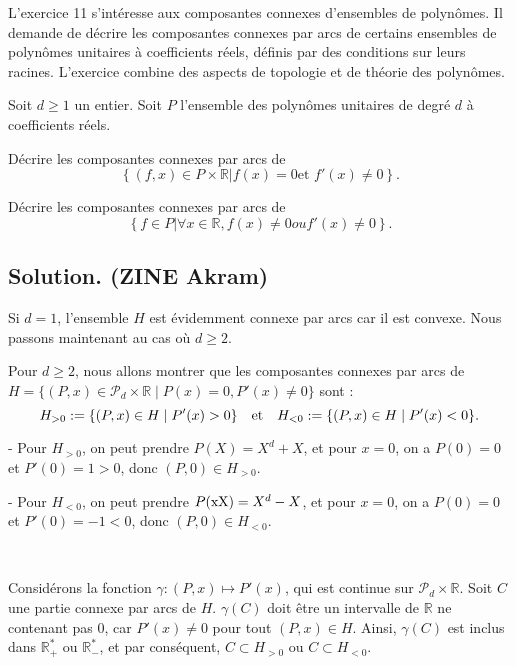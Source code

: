 L'exercice 11 s'int{\'e}resse aux composantes connexes d'ensembles de
polyn{\^o}mes. Il demande de d{\'e}crire les composantes connexes par arcs de
certains ensembles de polyn{\^o}mes unitaires {\`a} coefficients r{\'e}els,
d{\'e}finis par des conditions sur leurs racines. L'exercice combine des
aspects de topologie et de th{\'e}orie des polyn{\^o}mes.
\begin{exercise}
Soit $d \geq 1$ un entier. Soit $P$ l'ensemble des polyn{\^o}mes unitaires de
degr{\'e} $d$ {\`a} coefficients r{\'e}els.

D{\'e}crire les composantes connexes par arcs de
\[ \left\{ (f, x) \in P \times \mathbb{R} | f (x) = 0 \text{et } f' (x) \neq 0
   \right\} . \]


D{\'e}crire les composantes connexes par arcs de
\[ \left\{ f \in P | \forall x \in \mathbb{R}, f (x) \neq 0 ou  f' (x)
   \neq 0 \right\} . \]
\end{exercise}

\subsection*{Solution. (ZINE Akram)}


\tmtextbf{}Si $d = 1$, l'ensemble $H$ est {\'e}videmment connexe par arcs car
il est convexe. Nous passons maintenant au cas o{\`u} $d \geq 2$.

Pour $d \geq 2$, nous allons montrer que les composantes connexes par arcs de
$H =\{(P, x) \in \mathcal{P}_d \times \mathbb{R} \mid P (x) = 0, P' (x) \neq
0\}$ sont :
\[ H_{> 0} := \{(P, x) \in H \mid P' (x) > 0\} \quad \text{et} \quad H_{<
   0} := \{(P, x) \in H \mid P' (x) < 0\}. \]



- Pour $H_{> 0}$, on peut prendre $P (X) = X^d + X$, et pour $x = 0$, on a $P
(0) = 0$ et $P' (0) = 1 > 0$, donc $(P, 0) \in H_{> 0}$.

- Pour $H_{< 0}$, on peut prendre $P (\operatorname{xX}) = X^d - X$, et pour $x = 0$,
on a $P (0) = 0$ et $P' (0) = - 1 < 0$, donc $(P, 0) \in H_{< 0}$.

\


Consid{\'e}rons la fonction $\gamma : (P, x) \mapsto P' (x)$, qui est continue
sur $\mathcal{P}_d \times \mathbb{R}$. Soit $C$ une partie connexe par arcs de
$H$. $\gamma (C)$ doit {\^e}tre un intervalle de $\mathbb{R}$ ne contenant pas
0, car $P' (x) \neq 0$ pour tout $(P, x) \in H$. Ainsi, $\gamma (C)$ est
inclus dans $\mathbb{R}_+^{\ast}$ ou $\mathbb{R}_-^{\ast}$, et par
cons{\'e}quent, $C \subset H_{> 0}$ ou $C \subset H_{< 0}$.

